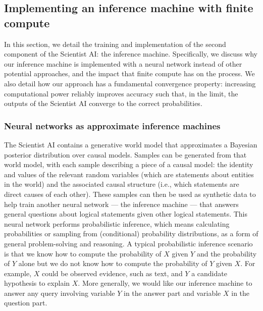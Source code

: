 \subsection{Implementing an inference machine with finite compute}
\label{sec:plan:inferencemachine}

In this section, we detail the training and implementation of the second component of the Scientist AI: the inference machine. Specifically, we discuss why our inference machine is implemented with a neural network instead of other potential approaches, and the impact that finite compute has on the process. We also detail how our approach has a fundamental convergence property: increasing computational power reliably improves accuracy such that, in the limit, the outputs of the Scientist AI converge to the correct probabilities.

\subsubsection{Neural networks as approximate inference machines}
    \label{sec:plan:inferencemachine:nn}

The Scientist AI contains a generative world model that approximates a Bayesian posterior distribution over causal models. Samples can be generated from that world model, with each sample describing a piece of a causal model: the identity and values of the relevant random variables (which are statements about entities in the world) and the associated causal structure (i.e., which statements are direct causes of each other). These samples can then be used as synthetic data to help train another neural network --- the inference machine --- that answers general questions about logical statements given other logical statements. This neural network performs probabilistic inference, which means calculating probabilities or sampling from (conditional) probability distributions, as a form of general problem-solving and reasoning. A typical probabilistic inference scenario is that we know how to compute the probability of $X$ given $Y$ and the probability of $Y$ alone but we do not know how to compute the probability of $Y$ given $X$. For example, $X$ could be observed evidence, such as text, and $Y$ a candidate hypothesis to explain $X$. More generally, we would like our inference machine to answer any query involving variable $Y$ in the answer part and variable $X$ in the question part.

